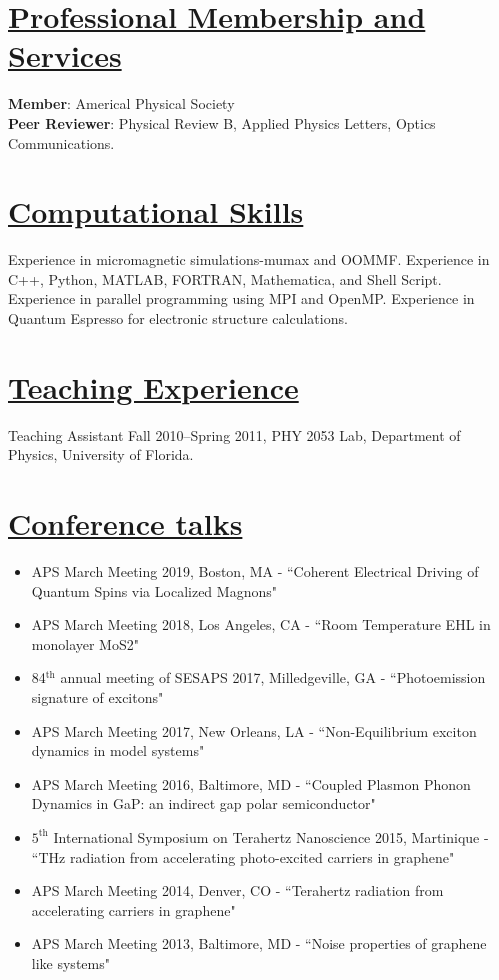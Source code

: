\documentclass[11pt]{article}
\begin{document}
\vspace{-0.1in}
 \section*{\underline{Professional Membership and Services}} 
\textbf{Member}: Americal Physical Society \\
\textbf{Peer Reviewer}: Physical Review B, Applied Physics Letters, Optics Communications.

\section*{\underline{Computational Skills}} 
  Experience in micromagnetic simulations-mumax and OOMMF. Experience in C++, Python,  MATLAB, FORTRAN, Mathematica, and Shell Script. Experience in parallel programming using MPI and OpenMP. Experience in Quantum Espresso for electronic structure calculations.
  
 \section*{\underline{Teaching Experience}}
 Teaching Assistant {Fall 2010--Spring 2011}, PHY 2053 Lab, Department of Physics, University of Florida.
 

\section*{\underline{Conference talks}}
 \begin{itemize}
 \itemsep-0.2em
\item APS March Meeting 2019, Boston, MA - ``Coherent Electrical Driving of Quantum Spins via Localized Magnons"

\item APS March Meeting 2018, Los Angeles, CA - ``Room Temperature EHL in monolayer MoS2"

 \item 84$^\mathrm{th}$ annual meeting of SESAPS 2017, Milledgeville, GA - ``Photoemission signature of excitons" 

\item APS March Meeting 2017, New Orleans, LA - ``Non-Equilibrium exciton dynamics in model systems" 
 
\item APS March Meeting 2016, Baltimore, MD - ``Coupled Plasmon Phonon Dynamics in GaP: an indirect gap polar semiconductor"

 \item $5^\mathrm{th}$ International Symposium on Terahertz Nanoscience 2015, Martinique - ``THz radiation from accelerating photo-excited carriers in graphene"

\item APS March Meeting 2014, Denver, CO  - ``Terahertz radiation from accelerating carriers in graphene"

\item APS March Meeting 2013, Baltimore, MD - ``Noise properties of graphene like systems"
 \end{itemize}
 
\end{document}

